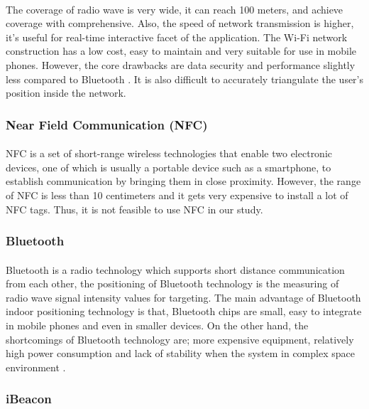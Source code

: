 \documentclass[12pt]{article}
\begin{document}
\paragraph{} The coverage of radio wave is very wide, it can reach 100 meters, and achieve coverage with comprehensive. Also, the speed of network transmission is higher, it’s useful for real-time interactive facet of the application. The Wi-Fi network construction has a low cost, easy to maintain and very suitable for use in mobile phones. However, the core drawbacks are data security and performance slightly less compared to Bluetooth \cite{indoor}. It is also difficult to accurately triangulate the user's position inside the network.

\subsubsection{Near Field Communication (NFC)}
\paragraph{}NFC is a set of short-range wireless technologies that enable two electronic devices, one of which is usually a portable device such as a smartphone, to establish communication by bringing them in close proximity. However, the range  of NFC is less than 10 centimeters and it gets very expensive to install a lot of NFC tags. \cite{tracking} Thus, it is not feasible to use NFC in our study.

\subsubsection{Bluetooth}
\paragraph{}Bluetooth is a radio technology which supports short distance communication from each other, the positioning of Bluetooth technology is the measuring of radio wave signal intensity values for targeting. The main advantage of Bluetooth indoor positioning technology is that, Bluetooth chips are small, easy to integrate in mobile phones and even in smaller devices. On the other hand, the shortcomings of Bluetooth technology are; more expensive equipment, relatively high power consumption and lack of stability when the system in complex space environment \cite{indoor}.

\subsubsection{iBeacon}
\end{document}
